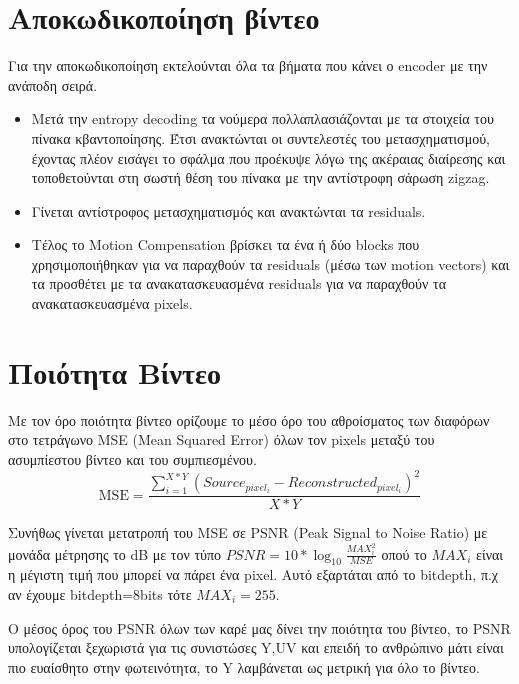 \section{Αποκωδικοποίηση βίντεο}
\label{section:sect26}

\indent Για την αποκωδικοποίηση εκτελούνται όλα τα βήματα που κάνει ο encoder με την ανάποδη σειρά.

\begin{itemize}
  \item Μετά την entropy decoding τα νούμερα πολλαπλασιάζονται με τα στοιχεία του πίνακα κβαντοποίησης. Έτσι ανακτώνται οι συντελεστές του μετασχηματισμού, έχοντας πλέον εισάγει το σφάλμα που προέκυψε λόγω της ακέραιας διαίρεσης και τοποθετούνται στη σωστή θέση του πίνακα με την αντίστροφη σάρωση zigzag.
  \item Γίνεται αντίστροφος μετασχηματισμός και ανακτώνται τα residuals.
  \item Τέλος το Motion Compensation βρίσκει τα ένα ή δύο blocks που χρησιμοποιήθηκαν για να παραχθούν τα residuals (μέσω των motion vectors) και τα προσθέτει με τα ανακατασκευασμένα residuals για να παραχθούν τα ανακατασκευασμένα pixels.
\end{itemize}

\section{Ποιότητα Βίντεο}
\label{section:sect27}

\indent Με τον όρο ποιότητα βίντεο ορίζουμε το μέσο όρο του αθροίσματος των διαφόρων στο τετράγωνο MSE (Mean Squared Error) όλων τον pixels μεταξύ του ασυμπίεστου βίντεο και του συμπιεσμένου. \begin{equation}
\text{MSE} =
\frac{\displaystyle\sum_{i=1}^{X*Y}
(Source_{pixel_i}-Reconstructed_{pixel_i})^{2}}{X*Y}
\end{equation}

\indent Συνήθως γίνεται μετατροπή του MSE σε PSNR (Peak Signal to Noise Ratio)  με μονάδα μέτρησης το \si{}{dB} με τον τύπο  $ PSNR = 10*\log_{10}{\frac{MAX_i^2}{MSE}}$ οπού το $MAX_i$ είναι η μέγιστη τιμή που μπορεί να πάρει ένα pixel. Αυτό εξαρτάται από το bitdepth, π.χ αν έχουμε bitdepth=8bits τότε $ MAX_i=255$.

\indent Ο μέσος όρος του PSNR όλων των καρέ μας δίνει την ποιότητα του βίντεο, το PSNR υπολογίζεται ξεχωριστά για τις συνιστώσες Y,UV και επειδή το ανθρώπινο μάτι είναι πιο ευαίσθητο στην φωτεινότητα, το Y λαμβάνεται ως μετρική για όλο το βίντεο.

